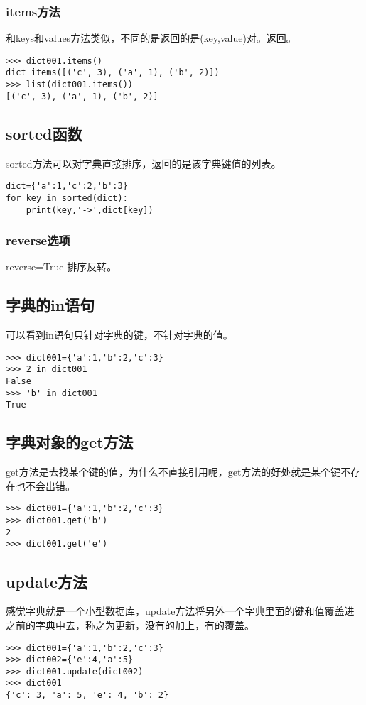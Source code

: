 \documentclass[12pt,oneside]{book}
\begin{document}
\begin{common-format}
\subsubsection{items方法}
和keys和values方法类似，不同的是返回的是(key,value)对。返回。
\begin{Verbatim}
>>> dict001.items()
dict_items([('c', 3), ('a', 1), ('b', 2)])
>>> list(dict001.items())
[('c', 3), ('a', 1), ('b', 2)]
\end{Verbatim}

\subsection{sorted函数}
sorted方法可以对字典直接排序，返回的是该字典键值的列表。
\begin{Verbatim}
dict={'a':1,'c':2,'b':3}
for key in sorted(dict):
    print(key,'->',dict[key])
\end{Verbatim}


\subsubsection{reverse选项}
reverse=True  排序反转。







\subsection{字典的in语句}
可以看到in语句只针对字典的键，不针对字典的值。
\begin{Verbatim}
>>> dict001={'a':1,'b':2,'c':3}
>>> 2 in dict001
False
>>> 'b' in dict001
True
\end{Verbatim}

\subsection{字典对象的get方法}
get方法是去找某个键的值，为什么不直接引用呢，get方法的好处就是某个键不存在也不会出错。
\begin{Verbatim}
>>> dict001={'a':1,'b':2,'c':3}
>>> dict001.get('b')
2
>>> dict001.get('e')
\end{Verbatim}

\subsection{update方法}
感觉字典就是一个小型数据库，update方法将另外一个字典里面的键和值覆盖进之前的字典中去，称之为更新，没有的加上，有的覆盖。
\begin{Verbatim}
>>> dict001={'a':1,'b':2,'c':3}
>>> dict002={'e':4,'a':5}
>>> dict001.update(dict002)
>>> dict001
{'c': 3, 'a': 5, 'e': 4, 'b': 2}
\end{Verbatim}


\end{common-format}
\end{document}
